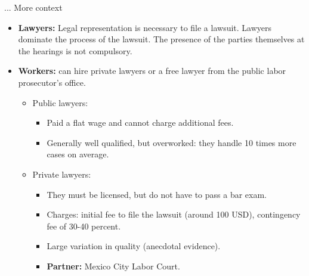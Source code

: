 \documentclass[9pt]{beamer}
\begin{document}
     
\begin{frame}{... More context}
    \begin{itemize}     
       \item \textbf{Lawyers:} Legal representation is necessary to file a lawsuit. Lawyers dominate the process of the lawsuit. The presence of the parties themselves at the hearings is not compulsory. 
       \vspace{0.05in}
       
        \item   \textbf{Workers:} can hire private lawyers or a free lawyer from the public labor prosecutor's office.
        \vspace{0.05in}
            \begin{itemize}
                \item Public lawyers:
                \begin{itemize}
                    \item Paid a flat wage and cannot charge additional fees.
                    \item Generally well qualified, but overworked: they handle 10 times more cases on average.
                \end{itemize}
                \vspace{0.05in}
                \item Private lawyers:
                \begin{itemize}
                    \item They must be licensed, but do not have to pass a bar exam.
                    \item Charges: initial fee to file the lawsuit (around 100 USD), contingency fee of 30-40 percent.
                    \item Large variation in quality (anecdotal evidence).
                     \item \textbf{Partner:} Mexico City Labor Court.
       \vspace{0.1in}
                \end{itemize} 
            \end{itemize}

    \end{itemize}
\end{frame}
\end{document}
